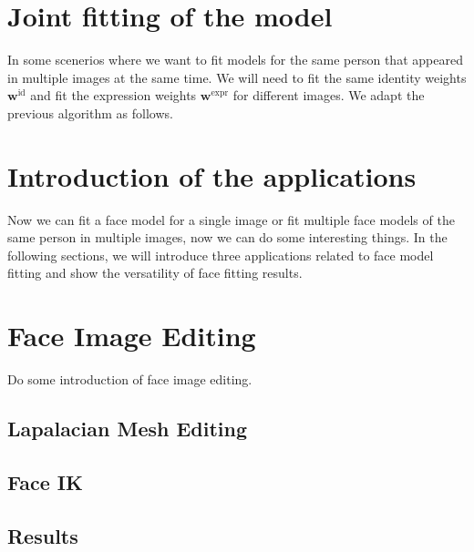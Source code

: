 \section{Joint fitting of the model}
In some scenerios where we want to fit models for the same person that appeared in multiple images at the same time. We will need to fit the same identity weights $\mathbf{w}^{\text{id}}$ and fit the expression weights $\mathbf{w}^{\text{expr}}$ for different images. We adapt the previous algorithm as follows.

\section{Introduction of the applications}
Now we can fit a face model for a single image or fit multiple face models of the same person in multiple images, now we can do some interesting things. In the following sections, we will introduce three applications related to face model fitting and show the versatility of face fitting results.

\section{Face Image Editing}
Do some introduction of face image editing.
\subsection{Lapalacian Mesh Editing}

\subsection{Face IK}

\subsection{Results}


